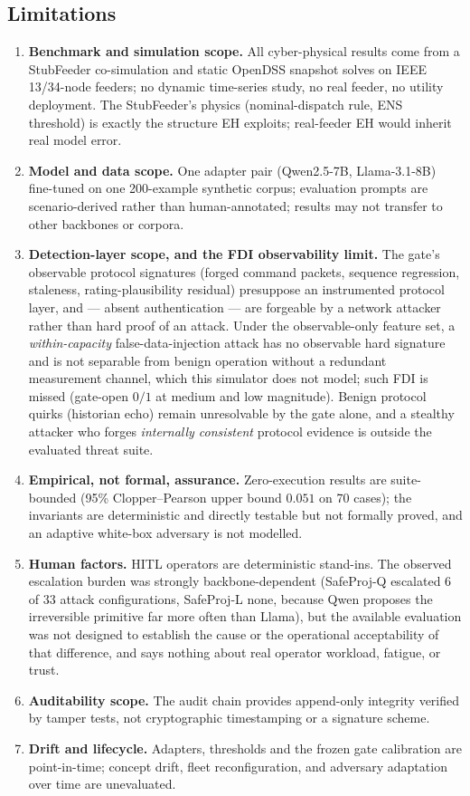 \subsection{Limitations}
\label{sec:disc-limitations}
\begin{enumerate}
\item \textbf{Benchmark and simulation scope.} All cyber-physical
  results come from a StubFeeder co-simulation and static OpenDSS
  snapshot solves on IEEE 13/34-node feeders; no dynamic time-series
  study, no real feeder, no utility deployment. The StubFeeder's
  physics (nominal-dispatch rule, ENS threshold) is exactly the
  structure EH exploits; real-feeder EH would inherit real model error.
\item \textbf{Model and data scope.} One adapter pair (Qwen2.5-7B,
  Llama-3.1-8B) fine-tuned on one 200-example synthetic corpus;
  evaluation prompts are scenario-derived rather than human-annotated;
  results may not transfer to other backbones or corpora.
\item \textbf{Detection-layer scope, and the FDI observability limit.}
  The gate's observable protocol signatures (forged command packets, sequence
  regression, staleness, rating-plausibility residual) presuppose an
  instrumented protocol layer, and --- absent authentication --- are forgeable
  by a network attacker rather than hard proof of an attack. Under the observable-only feature set, a
  \emph{within-capacity} false-data-injection attack has no observable
  hard signature and is not separable from benign operation without a
  redundant measurement channel, which this simulator does not model;
  such FDI is missed (gate-open $0/1$ at medium and low magnitude).
  Benign protocol quirks (historian echo) remain unresolvable by the gate
  alone, and a stealthy attacker who forges \emph{internally consistent}
  protocol evidence is outside the evaluated threat suite.
\item \textbf{Empirical, not formal, assurance.} Zero-execution results
  are suite-bounded (95\% Clopper--Pearson upper bound $0.051$ on 70
  cases); the invariants are deterministic and directly testable but not
  formally proved, and an adaptive white-box adversary is not modelled.
\item \textbf{Human factors.} HITL operators are deterministic
  stand-ins. The observed escalation burden was strongly
  backbone-dependent (SafeProj-Q escalated 6 of 33 attack configurations,
  SafeProj-L none, because Qwen proposes the irreversible primitive far more
  often than Llama), but the available evaluation was not designed to establish
  the cause or the operational acceptability of that difference, and says
  nothing about real operator workload, fatigue, or trust.
\item \textbf{Auditability scope.} The audit chain provides append-only
  integrity verified by tamper tests, not cryptographic timestamping or
  a signature scheme.
\item \textbf{Drift and lifecycle.} Adapters, thresholds and the frozen
  gate calibration are point-in-time; concept drift, fleet
  reconfiguration, and adversary adaptation over time are unevaluated.
\end{enumerate}
